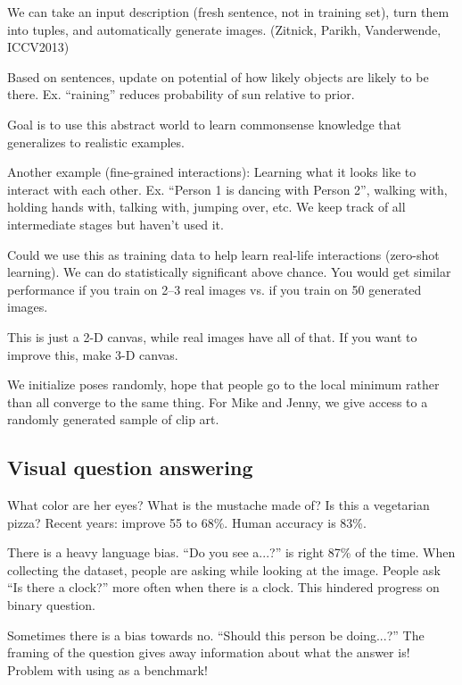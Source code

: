 We can take an input description (fresh sentence, not in training set), turn them into tuples, and automatically generate images. (Zitnick, Parikh, Vanderwende, ICCV2013)



Based on sentences, update on potential of how likely objects are likely to be there. Ex. ``raining'' reduces probability of sun relative to prior.

Goal is to use this abstract world to learn commonsense knowledge that generalizes to realistic examples.

Another example (fine-grained interactions): Learning what it looks like to interact with each other. Ex. ``Person 1 is dancing with Person 2'', walking with, holding hands with, talking with, jumping over, etc. We keep track of all intermediate stages but haven't used it.

Could we use this as training data to help learn real-life interactions (zero-shot learning). We can do statistically significant above chance. You would get similar performance if you train on 2--3 real images vs. if you train on 50 generated images.

This is just a 2-D canvas, while real images have all of that. If you want to improve this, make 3-D canvas.

We initialize poses randomly, hope that people go to the local minimum rather than all converge to the same thing. For Mike and Jenny, we give access to a randomly generated sample of clip art.

\subsection{Visual question answering}

What color are her eyes? What is the mustache made of? Is this a vegetarian pizza? Recent years: improve 55 to 68\%. Human accuracy is 83\%. 

There is a heavy language bias. %
``Do you see a...?'' is right 87\% of the time.
When collecting the dataset, people are asking while looking at the image. People ask ``Is there a clock?'' more often when there is a clock.
This hindered progress on binary question.

Sometimes there is a bias towards no. ``Should this person be doing...?'' The framing of the question gives away information about what the answer is! Problem with using as a benchmark!

